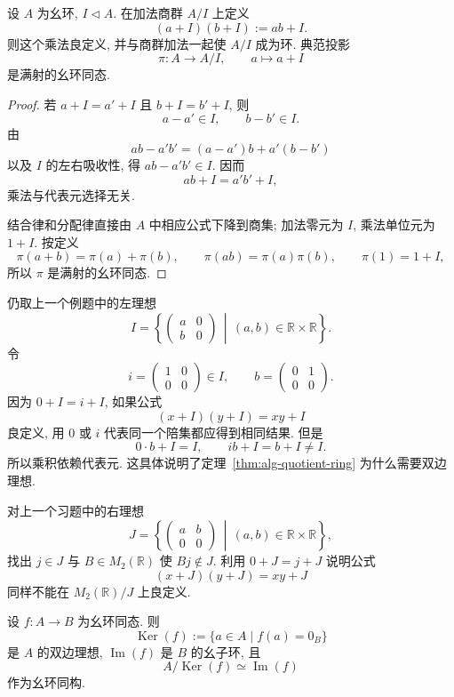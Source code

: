 \documentclass[usesamecnt, thmcnt=section, lang=cn, newtx, 10pt, scheme=chinese]{elegantbook}
\begin{document}
\begin{theorem}\label{thm:alg-quotient-ring}
设 $A$ 为幺环, $I\triangleleft A$. 在加法商群 $A/I$ 上定义
\[
 (a+I)(b+I):=ab+I.
\]
则这个乘法良定义, 并与商群加法一起使 $A/I$ 成为环. 典范投影
\[
 \pi:A\longrightarrow A/I,
 \qquad a\longmapsto a+I
\]
是满射的幺环同态.
\end{theorem}

\begin{proof}
若 $a+I=a'+I$ 且 $b+I=b'+I$, 则
\[
 a-a'\in I,
 \qquad
 b-b'\in I.
\]
由
\[
 ab-a'b'
 =(a-a')b+a'(b-b')
\]
以及 $I$ 的左右吸收性, 得 $ab-a'b'\in I$. 因而
\[
 ab+I=a'b'+I,
\]
乘法与代表元选择无关.

结合律和分配律直接由 $A$ 中相应公式下降到商集; 加法零元为 $I$, 乘法单位元为 $1+I$. 按定义
\[
 \pi(a+b)=\pi(a)+\pi(b),
 \qquad
 \pi(ab)=\pi(a)\pi(b),
 \qquad
 \pi(1)=1+I,
\]
所以 $\pi$ 是满射的幺环同态.
\end{proof}

\begin{instance}
仍取上一个例题中的左理想
\[
 I=\left\{
 \begin{pmatrix}a&0\\ b&0\end{pmatrix}
 \,\middle|\,(a,b)\in\mathbb R\times\mathbb R
 \right\}.
\]
令
\[
 i=\begin{pmatrix}1&0\\0&0\end{pmatrix}\in I,
 \qquad
 b=\begin{pmatrix}0&1\\0&0\end{pmatrix}.
\]
因为 $0+I=i+I$, 如果公式
\[
 (x+I)(y+I)=xy+I
\]
良定义, 用 $0$ 或 $i$ 代表同一个陪集都应得到相同结果. 但是
\[
 0\cdot b+I=I,
 \qquad
 ib+I=b+I\neq I.
\]
所以乘积依赖代表元. 这具体说明了定理~\ref{thm:alg-quotient-ring} 为什么需要双边理想.
\end{instance}

\begin{exercise}\label{ex:alg-two-sided-essential}
对上一个习题中的右理想
\[
 J=\left\{
 \begin{pmatrix}a&b\\0&0\end{pmatrix}
 \,\middle|\,(a,b)\in\mathbb R\times\mathbb R
 \right\},
\]
找出 $j\in J$ 与 $B\in M_2(\mathbb R)$ 使 $Bj\notin J$. 利用 $0+J=j+J$ 说明公式
\[
 (x+J)(y+J)=xy+J
\]
同样不能在 $M_2(\mathbb R)/J$ 上良定义.
\end{exercise}

\begin{theorem}[幺环同态第一同构定理]\label{thm:alg-first-iso-ring}
设 $f:A\to B$ 为幺环同态. 则
\[
 \operatorname{Ker}(f):=\{a\in A\mid f(a)=0_B\}
\]
是 $A$ 的双边理想, $\operatorname{Im}(f)$ 是 $B$ 的幺子环, 且
\[
 A/\operatorname{Ker}(f)\simeq\operatorname{Im}(f)
\]
作为幺环同构.
\end{theorem}
\end{document}
